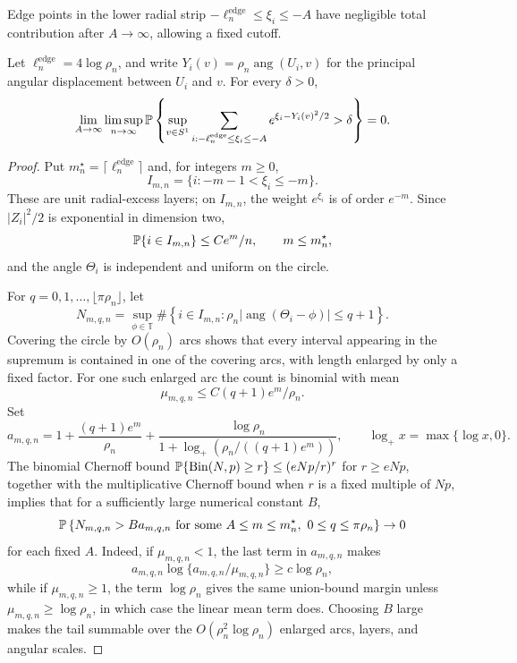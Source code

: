 Edge points in the lower radial strip \(-\ell_n^{\mathrm{edge}}\le \xi_i\le-A\) have negligible
total contribution after \(A\to\infty\), allowing a fixed cutoff.
\begin{lemma}
\label{lem:d2-low-atom-absorption}
Let \(\ell_n^{\mathrm{edge}}=4\log\rho_n\), and write
\(Y_i(v)=\rho_n\operatorname{ang}(U_i,v)\) for the principal angular
displacement between \(U_i\) and \(v\).  For every
\(\delta>0\),
\[
    \lim_{A\to\infty}\limsup_{n\to\infty}
    \mathbb P\left\{
    \sup_{v\in S^1}
    \sum_{i:-\ell_n^{\mathrm{edge}}\le \xi_i\le -A}
    e^{\xi_i-Y_i(v)^2/2}>\delta
    \right\}=0 .
\]
\end{lemma}

\begin{proof}
Put \(m_n^\star=\lceil \ell_n^{\mathrm{edge}}\rceil\) and, for integers \(m\ge0\),
\[
    I_{m,n}=\{i:-m-1<\xi_i\le -m\}.
\]
These are unit radial-excess layers; on \(I_{m,n}\), the weight \(e^{\xi_i}\)
is of order \(e^{-m}\).  Since
\(|Z_i|^2/2\) is exponential in dimension two,
\[
    \mathbb P\{i\in I_{m,n}\}\le C e^m/n,
    \qquad m\le m_n^\star,
\]
and the angle \(\Theta_i\) is independent and uniform on the circle.

For \(q=0,1,\ldots,\lfloor\pi\rho_n\rfloor\), let
\[
    N_{m,q,n}
    =
    \sup_{\phi\in\mathbb T}
    \#\left\{
        i\in I_{m,n}:
        \rho_n|\operatorname{ang}(\Theta_i-\phi)|\le q+1
    \right\}.
\]
Covering the circle by \(O(\rho_n)\) arcs shows that every interval appearing
in the supremum is contained in one of the covering arcs, with length enlarged
by only a fixed factor.  For one such enlarged arc the count is binomial with
mean
\[
    \mu_{m,q,n}\le C(q+1)e^m/\rho_n .
\]
Set
\[
    a_{m,q,n}
    =
    1+\frac{(q+1)e^m}{\rho_n}
    +
    \frac{\log\rho_n}
        {1+\log_+\!\left(\rho_n/((q+1)e^m)\right)},
    \qquad
    \log_+ x=\max\{\log x,0\}.
\]
The binomial Chernoff bound
\(\mathbb P\{\operatorname{Bin}(N,p)\ge r\}\le (eNp/r)^r\) for
\(r\ge eNp\), together with the multiplicative Chernoff bound when
\(r\) is a fixed multiple of \(Np\), implies that for a sufficiently large
numerical constant \(B\),
\[
    \mathbb P\left\{
        N_{m,q,n}>B a_{m,q,n}
        \text{ for some } A\le m\le m_n^\star,\ 0\le q\le \pi\rho_n
    \right\}\to0
\]
for each fixed \(A\).  Indeed, if \(\mu_{m,q,n}<1\), the last term in
\(a_{m,q,n}\) makes
\[
    a_{m,q,n}\log\{a_{m,q,n}/\mu_{m,q,n}\}\ge c\log\rho_n,
\]
while if \(\mu_{m,q,n}\ge1\), the term \(\log\rho_n\) gives the same
union-bound margin unless \(\mu_{m,q,n}\ge\log\rho_n\), in which case the
linear mean term does.  Choosing \(B\) large makes the tail summable over
the \(O(\rho_n^2\log\rho_n)\) enlarged arcs, layers, and angular scales.


\end{proof}
